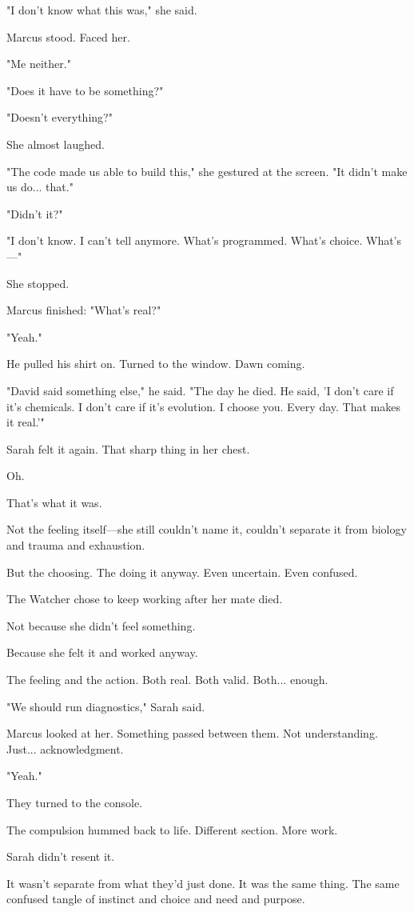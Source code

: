 "I don't know what this was," she said.

Marcus stood. Faced her.

"Me neither."

"Does it have to be something?"

"Doesn't everything?"

She almost laughed.

"The code made us able to build this," she gestured at the screen. "It didn't make us do... that."

"Didn't it?"

"I don't know. I can't tell anymore. What's programmed. What's choice. What's—"

She stopped.

Marcus finished: "What's real?"

"Yeah."

He pulled his shirt on. Turned to the window. Dawn coming.

"David said something else," he said. "The day he died. He said, 'I don't care if it's chemicals. I don't care if it's evolution. I choose you. Every day. That makes it real.'"

Sarah felt it again. That sharp thing in her chest.

Oh.

That's what it was.

Not the feeling itself—she still couldn't name it, couldn't separate it from biology and trauma and exhaustion.

But the choosing. The doing it anyway. Even uncertain. Even confused.

The Watcher chose to keep working after her mate died.

Not because she didn't feel something.

Because she felt it and worked anyway.

The feeling and the action. Both real. Both valid. Both... enough.

"We should run diagnostics," Sarah said.

Marcus looked at her. Something passed between them. Not understanding. Just... acknowledgment.

"Yeah."

They turned to the console.

The compulsion hummed back to life. Different section. More work.

Sarah didn't resent it.

It wasn't separate from what they'd just done. It was the same thing. The same confused tangle of instinct and choice and need and purpose.

